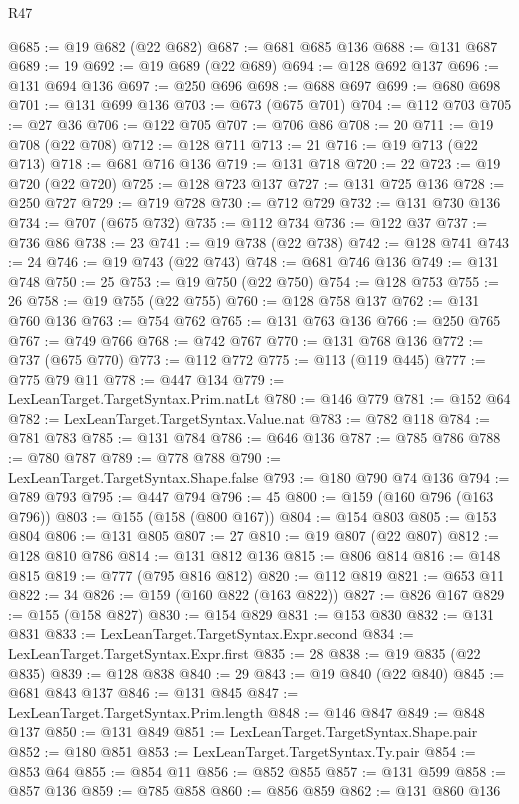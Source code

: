 \begin{lexlean}{R47}
\begin{coremodule}
@685 := @19 @682 (@22 @682)
@687 := @681 @685 @136
@688 := @131 @687
@689 := 19
@692 := @19 @689 (@22 @689)
@694 := @128 @692 @137
@696 := @131 @694 @136
@697 := @250 @696
@698 := @688 @697
@699 := @680 @698
@701 := @131 @699 @136
@703 := @673 (@675 @701)
@704 := @112 @703
@705 := @27 @36
@706 := @122 @705
@707 := @706 @86
@708 := 20
@711 := @19 @708 (@22 @708)
@712 := @128 @711
@713 := 21
@716 := @19 @713 (@22 @713)
@718 := @681 @716 @136
@719 := @131 @718
@720 := 22
@723 := @19 @720 (@22 @720)
@725 := @128 @723 @137
@727 := @131 @725 @136
@728 := @250 @727
@729 := @719 @728
@730 := @712 @729
@732 := @131 @730 @136
@734 := @707 (@675 @732)
@735 := @112 @734
@736 := @122 @37
@737 := @736 @86
@738 := 23
@741 := @19 @738 (@22 @738)
@742 := @128 @741
@743 := 24
@746 := @19 @743 (@22 @743)
@748 := @681 @746 @136
@749 := @131 @748
@750 := 25
@753 := @19 @750 (@22 @750)
@754 := @128 @753
@755 := 26
@758 := @19 @755 (@22 @755)
@760 := @128 @758 @137
@762 := @131 @760 @136
@763 := @754 @762
@765 := @131 @763 @136
@766 := @250 @765
@767 := @749 @766
@768 := @742 @767
@770 := @131 @768 @136
@772 := @737 (@675 @770)
@773 := @112 @772
@775 := @113 (@119 @445)
@777 := @775 @79 @11
@778 := @447 @134
@779 := LexLeanTarget.TargetSyntax.Prim.natLt
@780 := @146 @779
@781 := @152 @64
@782 := LexLeanTarget.TargetSyntax.Value.nat
@783 := @782 @118
@784 := @781 @783
@785 := @131 @784
@786 := @646 @136
@787 := @785 @786
@788 := @780 @787
@789 := @778 @788
@790 := LexLeanTarget.TargetSyntax.Shape.false
@793 := @180 @790 @74 @136
@794 := @789 @793
@795 := @447 @794
@796 := 45
@800 := @159 (@160 @796 (@163 @796))
@803 := @155 (@158 (@800 @167))
@804 := @154 @803
@805 := @153 @804
@806 := @131 @805
@807 := 27
@810 := @19 @807 (@22 @807)
@812 := @128 @810 @786
@814 := @131 @812 @136
@815 := @806 @814
@816 := @148 @815
@819 := @777 (@795 @816 @812)
@820 := @112 @819
@821 := @653 @11
@822 := 34
@826 := @159 (@160 @822 (@163 @822))
@827 := @826 @167
@829 := @155 (@158 @827)
@830 := @154 @829
@831 := @153 @830
@832 := @131 @831
@833 := LexLeanTarget.TargetSyntax.Expr.second
@834 := LexLeanTarget.TargetSyntax.Expr.first
@835 := 28
@838 := @19 @835 (@22 @835)
@839 := @128 @838
@840 := 29
@843 := @19 @840 (@22 @840)
@845 := @681 @843 @137
@846 := @131 @845
@847 := LexLeanTarget.TargetSyntax.Prim.length
@848 := @146 @847
@849 := @848 @137
@850 := @131 @849
@851 := LexLeanTarget.TargetSyntax.Shape.pair
@852 := @180 @851
@853 := LexLeanTarget.TargetSyntax.Ty.pair
@854 := @853 @64
@855 := @854 @11
@856 := @852 @855
@857 := @131 @599
@858 := @857 @136
@859 := @785 @858
@860 := @856 @859
@862 := @131 @860 @136

\end{coremodule}
\end{lexlean}
